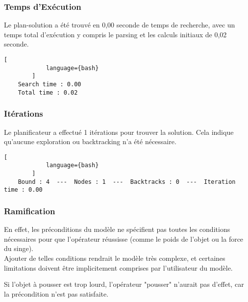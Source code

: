 \documentclass[../CSC_5RO16_TA_TP5.tex]{subfiles}
\begin{document}
\subsubsection{Temps d'Exécution}
\begin{resolution}
    Le plan-solution a été trouvé en 0,00 seconde de temps de recherche, avec un temps total d'exécution y compris le parsing et les calculs initiaux de 0,02 seconde.

    \begin{scriptsize}\mycode
        \begin{lstlisting}[
            language={bash}
        ]
    Search time : 0.00
    Total time : 0.02
        \end{lstlisting}
    \end{scriptsize}
\end{resolution}

\subsubsection{Itérations}
\begin{resolution}
    Le planificateur a effectué 1 itérations pour trouver la solution. Cela indique qu'aucune exploration ou backtracking n'a été nécessaire.

    \begin{scriptsize}\mycode
        \begin{lstlisting}[
            language={bash}
        ]
    Bound : 4  ---  Nodes : 1  ---  Backtracks : 0  ---  Iteration time : 0.00
        \end{lstlisting}
    \end{scriptsize}
\end{resolution}

\subsubsection{Ramification}
\noindent En effet, les préconditions du modèle ne spécifient pas toutes les conditions nécessaires pour que l'opérateur réussisse (comme le poids de l'objet ou la force du singe).\\

\noindent Ajouter de telles conditions rendrait le modèle très complexe, et certaines limitations doivent être implicitement comprises par l'utilisateur du modèle.

\begin{example}
    Si l'objet à pousser est trop lourd, l'opérateur "pousser" n'aurait pas d'effet, car la précondition n'est pas satisfaite.
\end{example}
\end{document}
